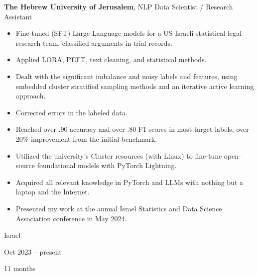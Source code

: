 \documentclass[10pt, letterpaper]{article}
\newenvironment{highlights}{
    \begin{itemize}[
        topsep=0.10 cm,
        parsep=0.10 cm,
        partopsep=0pt,
        itemsep=0pt,
        leftmargin=0.4 cm + 10pt
    ]
}{
    \end{itemize}
} %
\newenvironment{twocolentry}[2][]{
    \onecolentry
    \def\secondColumn{#2}
    \setcolumnwidth{\fill, 4.5 cm}
    \begin{paracol}{2}
}{
    \switchcolumn \raggedleft \secondColumn
    \end{paracol}
    \endonecolentry
} %
\begin{document}
        
        \begin{twocolentry}{
            Israel

        Oct 2023 – present

        11 months
        }
            \textbf{The Hebrew University of Jerusalem}, NLP Data Scientist / Research Assistant
            \begin{highlights}
                \item Fine-tuned (SFT) Large Language models for a US-Israeli statistical legal research team, classified arguments in trial records.
                \item Applied LORA, PEFT, text cleaning, and statistical methods.
                \item Dealt with the significant imbalance and noisy labels and features, using embedded cluster stratified sampling methods and an iterative active learning approach.
                \item Corrected errors in the labeled data.
                \item Reached over .90 accuracy and over .80 F1 scores in most target labels, over 20\% improvement from the initial benchmark.
                \item Utilized the university's Cluster resources (with Linux) to fine-tune open-source foundational models with PyTorch Lightning.
                \item Acquired all relevant knowledge in PyTorch and LLMs with nothing but a laptop and the Internet.
                \item Presented my work at the annual Israel Statistics and Data Science Association conference in May 2024.
            \end{highlights}
        \end{twocolentry}


        \vspace{0.2 cm}
\end{document}
